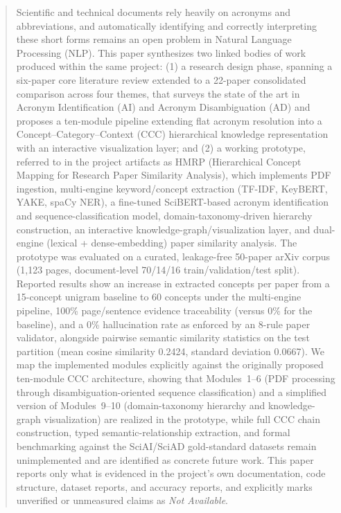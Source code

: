 \documentclass[10pt,conference]{IEEEtran}
\begin{document}
\begin{abstract}
Scientific and technical documents rely heavily on acronyms and abbreviations, and automatically identifying and correctly interpreting these short forms remains an open problem in Natural Language Processing (NLP). This paper synthesizes two linked bodies of work produced within the same project: (1) a research design phase, spanning a six-paper core literature review extended to a 22-paper consolidated comparison across four themes, that surveys the state of the art in Acronym Identification (AI) and Acronym Disambiguation (AD) and proposes a ten-module pipeline extending flat acronym resolution into a Concept--Category--Context (CCC) hierarchical knowledge representation with an interactive visualization layer; and (2) a working prototype, referred to in the project artifacts as HMRP (Hierarchical Concept Mapping for Research Paper Similarity Analysis), which implements PDF ingestion, multi-engine keyword/concept extraction (TF-IDF, KeyBERT, YAKE, spaCy NER), a fine-tuned SciBERT-based acronym identification and sequence-classification model, domain-taxonomy-driven hierarchy construction, an interactive knowledge-graph/visualization layer, and dual-engine (lexical + dense-embedding) paper similarity analysis. The prototype was evaluated on a curated, leakage-free 50-paper arXiv corpus (1{,}123 pages, document-level 70/14/16 train/validation/test split). Reported results show an increase in extracted concepts per paper from a 15-concept unigram baseline to 60 concepts under the multi-engine pipeline, 100\% page/sentence evidence traceability (versus 0\% for the baseline), and a 0\% hallucination rate as enforced by an 8-rule paper validator, alongside pairwise semantic similarity statistics on the test partition (mean cosine similarity 0.2424, standard deviation 0.0667). We map the implemented modules explicitly against the originally proposed ten-module CCC architecture, showing that Modules~1--6 (PDF processing through disambiguation-oriented sequence classification) and a simplified version of Modules~9--10 (domain-taxonomy hierarchy and knowledge-graph visualization) are realized in the prototype, while full CCC chain construction, typed semantic-relationship extraction, and formal benchmarking against the SciAI/SciAD gold-standard datasets remain unimplemented and are identified as concrete future work. This paper reports only what is evidenced in the project's own documentation, code structure, dataset reports, and accuracy reports, and explicitly marks unverified or unmeasured claims as \emph{Not Available}.
\end{abstract}
\end{document}
